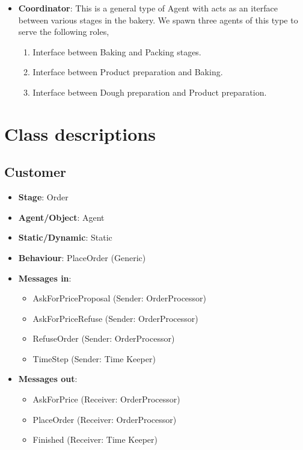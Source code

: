 \documentclass[12pt]{article}
\begin{document}
\begin{itemize}
    \item \textbf{Coordinator}: This is a general type of Agent with acts as an iterface between various stages in the bakery. We spawn three agents of this type to serve the following roles,
    \begin{enumerate}
    \item Interface between Baking and Packing stages.
    \item Interface between Product preparation and Baking.
    \item Interface between Dough preparation and Product preparation.
    \end{enumerate}
\end{itemize}


\section{Class descriptions}%
\label{sec:agent_descriptions}

\subsection{Customer}%
\label{sub:customer_agent}
\begin{itemize}
    \item \textbf{Stage}: Order
    \item \textbf{Agent/Object}: Agent
    \item \textbf{Static/Dynamic}: Static
    \item \textbf{Behaviour}: PlaceOrder (Generic)
    \item \textbf{Messages in}:
        \begin{itemize}
            \item AskForPriceProposal (Sender: OrderProcessor)
            \item AskForPriceRefuse (Sender: OrderProcessor)
            \item RefuseOrder (Sender: OrderProcessor)
            \item TimeStep (Sender: Time Keeper)
        \end{itemize}
    \item \textbf{Messages out}:
        \begin{itemize}
            \item AskForPrice (Receiver: OrderProcessor)
            \item PlaceOrder (Receiver: OrderProcessor)
            \item Finished (Receiver: Time Keeper)
        \end{itemize}
\end{itemize}
\end{document}
